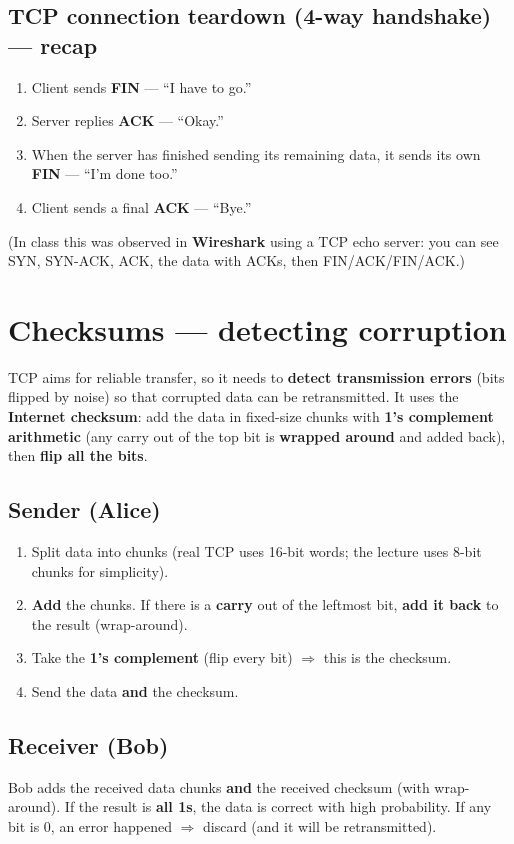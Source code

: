 \subsection{TCP connection teardown (4-way handshake) --- recap}
\begin{enumerate}
  \item Client sends \textbf{FIN} --- ``I have to go.''
  \item Server replies \textbf{ACK} --- ``Okay.''
  \item When the server has finished sending its remaining data, it sends its own \textbf{FIN} --- ``I'm done too.''
  \item Client sends a final \textbf{ACK} --- ``Bye.''
\end{enumerate}
(In class this was observed in \textbf{Wireshark} using a TCP echo server: you can see SYN, SYN-ACK, ACK, the data with ACKs, then FIN/ACK/FIN/ACK.)

\section{Checksums --- detecting corruption}
TCP aims for reliable transfer, so it needs to \textbf{detect transmission errors} (bits flipped by noise) so that corrupted data can be retransmitted. It uses the \textbf{Internet checksum}: add the data in fixed-size chunks with \textbf{1's complement arithmetic} (any carry out of the top bit is \textbf{wrapped around} and added back), then \textbf{flip all the bits}.

\subsection{Sender (Alice)}
\begin{enumerate}
  \item Split data into chunks (real TCP uses 16-bit words; the lecture uses 8-bit chunks for simplicity).
  \item \textbf{Add} the chunks. If there is a \textbf{carry} out of the leftmost bit, \textbf{add it back} to the result (wrap-around).
  \item Take the \textbf{1's complement} (flip every bit) $\Rightarrow$ this is the checksum.
  \item Send the data \textbf{and} the checksum.
\end{enumerate}

\subsection{Receiver (Bob)}
Bob adds the received data chunks \textbf{and} the received checksum (with wrap-around). If the result is \textbf{all 1s}, the data is correct with high probability. If any bit is 0, an error happened $\Rightarrow$ discard (and it will be retransmitted).

